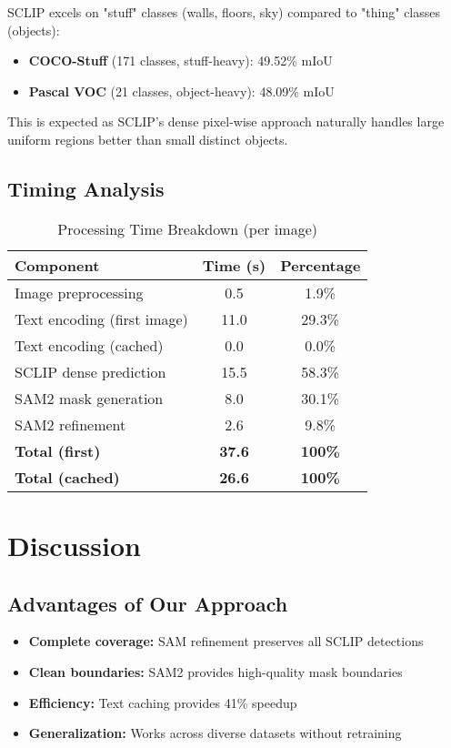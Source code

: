 SCLIP excels on "stuff" classes (walls, floors, sky) compared to "thing" classes (objects):

\begin{itemize}
    \item \textbf{COCO-Stuff} (171 classes, stuff-heavy): 49.52\% mIoU
    \item \textbf{Pascal VOC} (21 classes, object-heavy): 48.09\% mIoU
\end{itemize}

This is expected as SCLIP's dense pixel-wise approach naturally handles large uniform regions better than small distinct objects.

\subsection{Timing Analysis}

\begin{table}[h]
\centering
\caption{Processing Time Breakdown (per image)}
\label{tab:timing}
\begin{tabular}{lcc}
\hline
\textbf{Component} & \textbf{Time (s)} & \textbf{Percentage} \\
\hline
Image preprocessing & 0.5 & 1.9\% \\
Text encoding (first image) & 11.0 & 29.3\% \\
Text encoding (cached) & 0.0 & 0.0\% \\
SCLIP dense prediction & 15.5 & 58.3\% \\
SAM2 mask generation & 8.0 & 30.1\% \\
SAM2 refinement & 2.6 & 9.8\% \\
\hline
\textbf{Total (first)} & \textbf{37.6} & \textbf{100\%} \\
\textbf{Total (cached)} & \textbf{26.6} & \textbf{100\%} \\
\hline
\end{tabular}
\end{table}

\section{Discussion}

\subsection{Advantages of Our Approach}

\begin{itemize}
    \item \textbf{Complete coverage:} SAM refinement preserves all SCLIP detections
    \item \textbf{Clean boundaries:} SAM2 provides high-quality mask boundaries
    \item \textbf{Efficiency:} Text caching provides 41\% speedup
    \item \textbf{Generalization:} Works across diverse datasets without retraining
\end{itemize}

